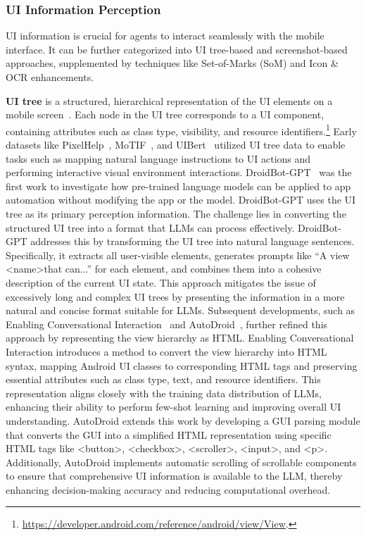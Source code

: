 \subsubsection{UI Information Perception}

UI information is crucial for agents to interact seamlessly with the mobile interface. It can be further categorized into UI tree-based and screenshot-based approaches, supplemented by techniques like Set-of-Marks (SoM) and Icon \& OCR enhancements.


\noindent\textbf{UI tree}
is a structured, hierarchical representation of the UI elements on a mobile screen~\cite{medhi2013comparison,rasanen2015sequence}. Each node in the UI tree corresponds to a UI component, containing attributes such as class type, visibility, and resource identifiers.\footnote{\href{https://developer.android.com/reference/android/view/View}{https://developer.android.com/reference/android/view/View}.} Early datasets like PixelHelp~\cite{li2020PixelHelp}, MoTIF~\cite{burns2021motif}, and UIBert~\cite{bai2021uibert} utilized UI tree data to enable tasks such as mapping natural language instructions to UI actions and performing interactive visual environment interactions.
DroidBot-GPT~\cite{wen2023droidbot} was the first work to investigate how pre-trained language models can be applied to app automation without modifying the app or the model. DroidBot-GPT uses the UI tree as its primary perception information. The challenge lies in converting the structured UI tree into a format that LLMs can process effectively. DroidBot-GPT addresses this by transforming the UI tree into natural language sentences. Specifically, it extracts all user-visible elements, generates prompts like ``A view \textless name\textgreater that can...'' for each element, and combines them into a cohesive description of the current UI state. This approach mitigates the issue of excessively long and complex UI trees by presenting the information in a more natural and concise format suitable for LLMs.
Subsequent developments, such as Enabling Conversational Interaction~\cite{wang2023enabling} and AutoDroid~\cite{wen2024autodroid}, further refined this approach by representing the view hierarchy as HTML. Enabling Conversational Interaction introduces a method to convert the view hierarchy into HTML syntax, mapping Android UI classes to corresponding HTML tags and preserving essential attributes such as class type, text, and resource identifiers. This representation aligns closely with the training data distribution of LLMs, enhancing their ability to perform few-shot learning and improving overall UI understanding. AutoDroid extends this work by developing a GUI parsing module that converts the GUI into a simplified HTML representation using specific HTML tags like \textless button\textgreater, \textless checkbox\textgreater, \textless scroller\textgreater, \textless input\textgreater, and \textless p\textgreater. Additionally, AutoDroid implements automatic scrolling of scrollable components to ensure that comprehensive UI information is available to the LLM, thereby enhancing decision-making accuracy and reducing computational overhead.
